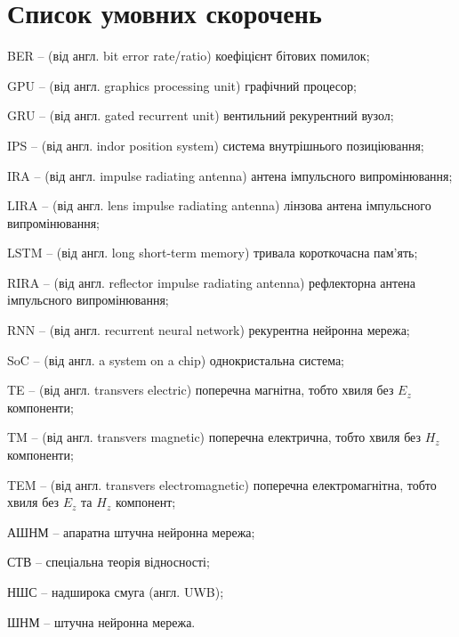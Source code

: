 \chapter*{Список умовних скорочень}


BER -- (від англ. bit error rate/ratio) коефіцієнт бітових помилок;

GPU -- (від англ. graphics processing unit) графічний процесор;

GRU -- (від англ. gated recurrent unit) вентильний рекурентний вузол;

IPS -- (від англ. indor position system) система внутрішнього позиціювання;

IRA -- (від англ. impulse radiating antenna) антена імпульсного випромінювання;

LIRA -- (від англ. lens impulse radiating antenna) лінзова антена імпульсного
випромінювання;

LSTM -- (від англ. long short-term memory) тривала короткочасна пам'ять;

RIRA -- (від англ. reflector impulse radiating antenna) рефлекторна антена 
імпульсного випромінювання;

RNN -- (від англ. recurrent neural network) рекурентна нейронна мережа;

SoC -- (від англ. a system on a chip) однокристальна система;

TE -- (від англ. transvers electric) поперечна магнітна, тобто хвиля без 
$ E_z $ компоненти;

TM -- (від англ. transvers magnetic) поперечна електрична, тобто хвиля без 
$ H_z $ компоненти;

TEM -- (від англ. transvers electromagnetic) поперечна електромагнітна, тобто 
хвиля  без $ E_z $ та $ H_z $ компонент;

АШНМ -- апаратна штучна нейронна мережа;

СТВ -- спеціальна теорія відносності;

НШС -- надширока смуга (англ. UWB);

ШНМ -- штучна нейронна мережа.
